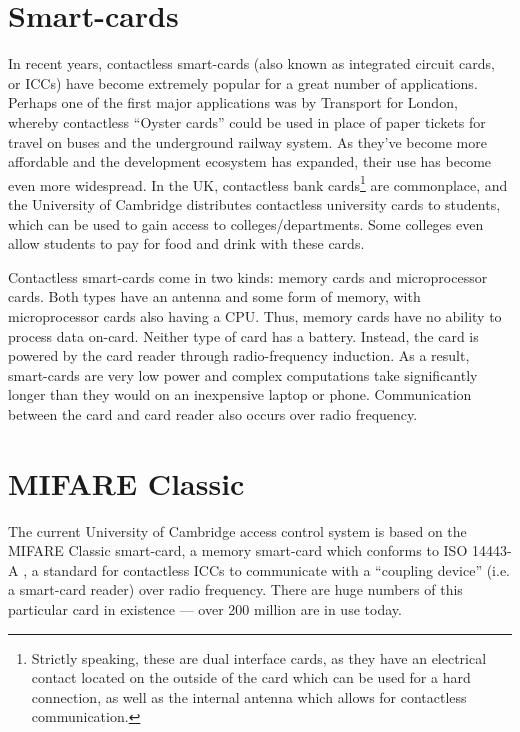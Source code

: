 \documentclass[12pt,a4paper,twoside,openright]{report}
\begin{document}
\section{Smart-cards}

In recent years, contactless smart-cards (also known as integrated circuit cards, or ICCs) have become extremely popular for a great number of applications. Perhaps one of the first major applications was by Transport for London, whereby contactless ``Oyster cards'' could be used in place of paper tickets for travel on buses and the underground railway system. As they've become more affordable and the development ecosystem has expanded, their use has become even more widespread. In the UK, contactless bank cards\footnote{Strictly speaking, these are dual interface cards, as they have an electrical contact located on the outside of the card which can be used for a hard connection, as well as the internal antenna which allows for contactless communication.} are commonplace, and the University of Cambridge distributes contactless university cards to students, which can be used to gain access to colleges/departments. Some colleges even allow students to pay for food and drink with these cards.

Contactless smart-cards come in two kinds: memory cards and microprocessor cards. Both types have an antenna and some form of memory, with microprocessor cards also having a CPU. Thus, memory cards have no ability to process data on-card. Neither type of card has a battery. Instead, the card is powered by the card reader through radio-frequency induction. As a result, smart-cards are very low power and complex computations take significantly longer than they would on an inexpensive laptop or phone. Communication between the card and card reader also occurs over radio frequency.

\section{MIFARE Classic}

The current University of Cambridge access control system is based on the MIFARE Classic smart-card, a memory smart-card which conforms to ISO 14443-A \cite{ISO14443}, a standard for contactless ICCs to communicate with a ``coupling device'' (i.e. a smart-card reader) over radio frequency. There are huge numbers of this particular card in existence --- over 200 million are in use today.
\end{document}
